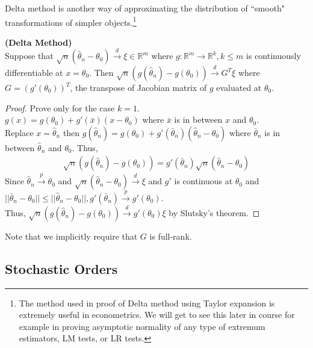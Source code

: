 \documentclass[11pt]{article} %
\theoremstyle{definition}
\numberwithin{defn}{subsection}
\numberwithin{thm}{subsection}
\numberwithin{ex}{subsection}
\newcommand{\bb}[1]{\mathbb{#1}}
\newcommand{\R}{\bb{R}}
\newcommand{\plim}{\overset{p}{\rightarrow}}
\newcommand{\dlim}{\overset{d}{\rightarrow}}
\begin{document}
Delta method is another way of approximating the distribution of ``smooth" transformations of simpler objects.\footnote{The method used in proof of Delta method using Taylor expansion is extremely useful in econometrics. We will get to see this later in course for example in proving asymptotic normality of any type of extremum estimators, LM tests, or LR tests.}

\begin{thm}\label{thm:deltamethod}
	\textbf{(Delta Method)}\\
	Suppose that $\sqrt{n}(\hat{\theta}_n-\theta_0)\dlim\xi\in\R ^m$ where $g:\R^m\rightarrow\R^k,k\le m$ is continuously differentiable at $x=\theta_0$. Then $\sqrt{n}(g(\hat{\theta}_n)-g(\theta_0))\dlim G^T\xi$ where $G=(g'(\theta_0))^T$, the transpose of Jacobian matrix of $g$ evaluated at $\theta_0$.
	\begin{proof}
		Prove only for the case $k=1$.\\
		$g(x)=g(\theta_0)+g'(\bar{x})(x-\theta_0)$ where $\bar{x}$ is in between $x$ and $\theta_0$.\\
		Replace $x=\hat{\theta}_n$ then $g(\hat{\theta}_n)=g(\theta_0)+g'(\bar{\theta}_n)(\hat{\theta}_n-\theta_0)$ where $\bar{\theta}_n$ is in between $\hat{\theta}_n$ and $\theta_0$. Thus,
		\begin{align*}
		\sqrt{n}(g(\hat{\theta}_n)-g(\theta_0))=g'(\bar{\theta}_n)\sqrt{n}(\hat{\theta}_n-\theta_0)
		\end{align*}
		Since $\hat{\theta}_n\plim\theta_0$ and $\sqrt{n}(\hat{\theta}_n-\theta_0)\dlim\xi$ and $g'$ is continuous at $\theta_0$ and $||\bar{\theta}_n-\theta_0||\le||\hat{\theta}_n-\theta_0||,g'(\bar{\theta}_n)\plim g'(\theta_0)$.\\
		Thus, $\sqrt{n}(g(\hat{\theta}_n)-g(\theta_0))\dlim g'(\theta_0)\xi$ by Slutsky's theorem.
	\end{proof}	
	Note that we implicitly require that $G$ is full-rank.
\end{thm}

\subsection{Stochastic Orders}
\end{document}
